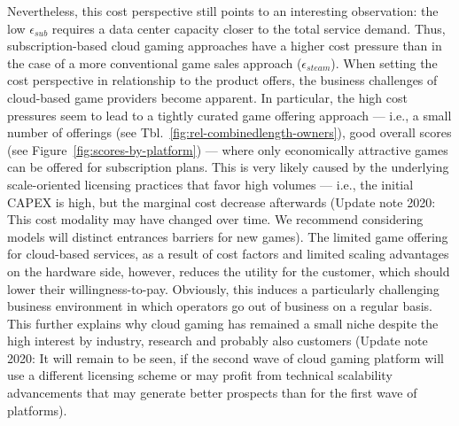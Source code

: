 Nevertheless, this cost perspective still points to an interesting observation: the low $\epsilon_{sub}$ requires a data center capacity closer to the total service demand. Thus, subscription-based cloud gaming approaches have a higher cost pressure than in the case of a more conventional game sales approach ($\epsilon_{steam}$). When setting the cost perspective in relationship to the product offers, the business challenges of cloud-based game providers become apparent. In particular, the high cost pressures seem to lead to a tightly curated game offering approach --- i.e., a small number of offerings (see Tbl.~\ref{fig:rel-combinedlength-owners}), good overall scores (see Figure~\ref{fig:scores-by-platform}) --- where only economically attractive games can be offered for subscription plans. This is very likely caused by the underlying scale-oriented licensing practices that favor high volumes --- i.e., the initial \gls{CAPEX} is high, but the marginal cost decrease afterwards (Update note 2020: This cost modality may have changed over time. We recommend considering models will distinct entrances barriers for new games). The limited game offering for cloud-based services, as a result of cost factors and limited scaling advantages on the hardware side, however, reduces the utility for the customer, which should lower their willingness-to-pay. Obviously, this induces a particularly challenging business environment in which operators go out of business on a regular basis. This further explains why cloud gaming has remained a small niche despite the high interest by industry, research and probably also customers (Update note 2020: It will remain to be seen, if the second wave of cloud gaming platform will use a different licensing scheme or may profit from technical scalability advancements that may generate better prospects than for the first wave of platforms).
